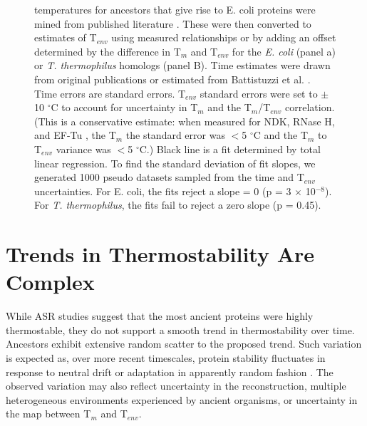 \begin{figure}
{temperatures for ancestors that give rise to E. coli proteins were
mined from published literature \cite{gaucher_palaeotemperature_2008,akanuma_experimental_2013,perez-jimenez_single-molecule_2011,risso_hyperstability_2013,hart_thermodynamic_2014}.
These were then converted to estimates of T$_{env}$ using measured
relationships \cite{gaucher_palaeotemperature_2008,akanuma_experimental_2013,hart_thermodynamic_2014}
or by adding an offset determined by the difference in T$_{m}$ and
T$_{env}$ for the \textit{E. coli} (panel a) or \textit{T. thermophilus}
homologs (panel B). Time estimates were drawn from original publications
or estimated from Battistuzzi et al. \cite{battistuzzi_genomic_2004}.
Time errors are standard errors. T$_{env}$ standard errors were set
to $\pm$ 10 $^{\circ}$C to account for uncertainty in T$_{m}$ and
the T$_{m}$/T$_{env}$ correlation. (This is a conservative estimate:
when measured for NDK, RNase H, and EF-Tu \cite{gaucher_palaeotemperature_2008,akanuma_experimental_2013,hart_thermodynamic_2014}
, the T$_{m}$ the standard error was $<$5 $^{\circ}$C and the T$_{m}$
to T$_{env}$ variance was $<$5 $^{\circ}$C.) Black line is a fit
determined by total linear regression. To find the standard deviation
of fit slopes, we generated 1000 pseudo datasets sampled from the
time and T$_{env}$ uncertainties. For E. coli, the fits reject a
slope = 0 (p = 3 $\times$ 10$^{-8}$). For \textit{T. thermophilus},
the fits fail to reject a zero slope (p = 0.45).\label{samplefigure}}
\end{figure}


\section{Trends in Thermostability Are Complex}

While ASR studies suggest that the most ancient proteins were highly
thermostable, they do not support a smooth trend in thermostability
over time. Ancestors exhibit extensive random scatter to the proposed
trend. Such variation is expected as, over more recent timescales,
protein stability fluctuates in response to neutral drift or adaptation
in apparently random fashion \cite{hobbs_origin_2012,loughran_stability_2014,malcolm_ancestral_1990,dasmeh_positively_2013,gong_stability-mediated_2013}.
The observed variation may also reflect uncertainty in the reconstruction,
multiple heterogeneous environments experienced by ancient organisms,
or uncertainty in the map between T$_{m}$ and T$_{env}$.

